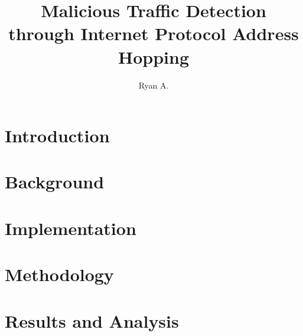 \documentclass[]{afit-etd}
\title  {Malicious Traffic Detection through Internet Protocol Address Hopping}
\author          {Ryan A.}{Morehart}
\begin{document}
\listofacronyms{
	
}

\makePrefatoryPages 


\chapter{Introduction}


\chapter{Background}


\chapter{Implementation}


\chapter{Methodology}


\chapter{Results and Analysis}

\end{document}
